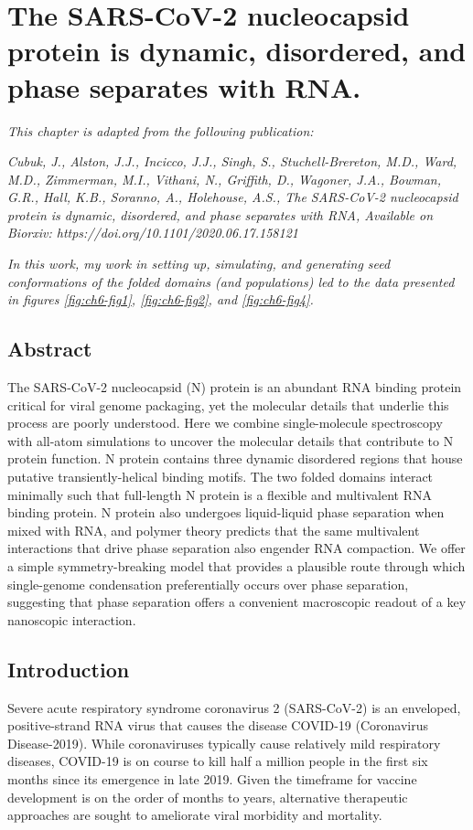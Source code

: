 \documentclass[../main.tex]{subfiles}
\begin{document}
	
    \chapter{The SARS-CoV-2 nucleocapsid protein is dynamic, disordered, and phase separates with RNA.}
    \graphicspath{{Chapter6/}}
    \label{ch:chapter6}
    \captionsetup{labelfont=bf}

    \textit{This chapter is adapted from the following publication:}
     
    \textit{Cubuk, J., Alston, J.J., Incicco, J.J., Singh, S., Stuchell-Brereton, M.D., Ward, M.D., Zimmerman, M.I., Vithani, N., Griffith, D., Wagoner, J.A., Bowman, G.R., Hall, K.B., Soranno, A., Holehouse, A.S., The SARS-CoV-2 nucleocapsid protein is dynamic, disordered, and phase separates with RNA, Available on Biorxiv: https://doi.org/10.1101/2020.06.17.158121}\cite{cubuk_sars-cov-2_2020}

    \textit{In this work, my work in setting up, simulating, and generating seed conformations of the folded domains (and populations) led to the data presented in figures \ref{fig:ch6-fig1}, \ref{fig:ch6-fig2}, and \ref{fig:ch6-fig4}.}
    	

    \section{Abstract}
        The SARS-CoV-2 nucleocapsid (N) protein is an abundant RNA binding protein critical for viral genome packaging, yet the molecular details that underlie this process are poorly understood. Here we combine single-molecule spectroscopy with all-atom simulations to uncover the molecular details that contribute to N protein function. N protein contains three dynamic disordered regions that house putative transiently-helical binding motifs. The two folded domains interact minimally such that full-length N protein is a flexible and multivalent RNA binding protein. N protein also undergoes liquid-liquid phase separation when mixed with RNA, and polymer theory predicts that the same multivalent interactions that drive phase separation also engender RNA compaction. We offer a simple symmetry-breaking model that provides a plausible route through which single-genome condensation preferentially occurs over phase separation, suggesting that phase separation offers a convenient macroscopic readout of a key nanoscopic interaction.

    \section{Introduction}
        Severe acute respiratory syndrome coronavirus 2 (SARS-CoV-2) is an enveloped, positive-strand RNA virus that causes the disease COVID-19 (Coronavirus Disease-2019)\cite{Zhu2020-do}. While coronaviruses typically cause relatively mild respiratory diseases, COVID-19 is on course to kill half a million people in the first six months since its emergence in late 2019\cite{Zhu2020-do,Corman2018-my,Roser2020-yb}. Given the timeframe for vaccine development is on the order of months to years, alternative therapeutic approaches are sought to ameliorate viral morbidity and mortality\cite{Lurie2020-vk}. 
\end{document}
